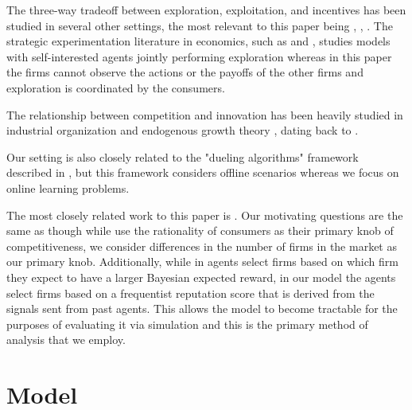 \documentclass{article}
\theoremstyle{definition}
\begin{document}
The three-way tradeoff between exploration, exploitation, and incentives has been studied in several other settings, the most relevant to this paper being \citealt*{che2017recommender}, \citealt*{kremer2014implementing}, \citealt*{mansour2015bayesian}. The strategic experimentation literature in economics, such as \citealt*{bolton1999strategic} and \citealt*{keller2005strategic}, studies models with self-interested agents jointly performing exploration whereas in this paper the firms cannot observe the actions or the payoffs of the other firms and exploration is coordinated by the consumers.

The relationship between competition and innovation has been heavily studied in industrial organization \citep{tirole1988theory} and endogenous growth theory \citep{aghion2005competition, barro2004economic}, dating back to \citet{schumpeter2010capitalism}.

Our setting is also closely related to the "dueling algorithms" framework described in \cite{immorlica2011dueling}, but this framework considers offline scenarios whereas we focus on online learning problems.

The most closely related work to this paper is \citealt*{mansour2018competing}. Our motivating questions are the same as \citet{mansour2018competing} though while \citet{mansour2018competing} use the rationality of consumers as their primary knob of competitiveness, we consider differences in the number of firms in the market as our primary knob. Additionally, while in \citet{mansour2018competing} agents select firms based on which firm they expect to have a larger Bayesian expected reward, in our model the agents select firms based on a frequentist reputation score that is derived from the signals sent from past agents. This allows the model to become tractable for the purposes of evaluating it via simulation and this is the primary method of analysis that we employ.

\section{Model}\label{section:2}
\end{document}
